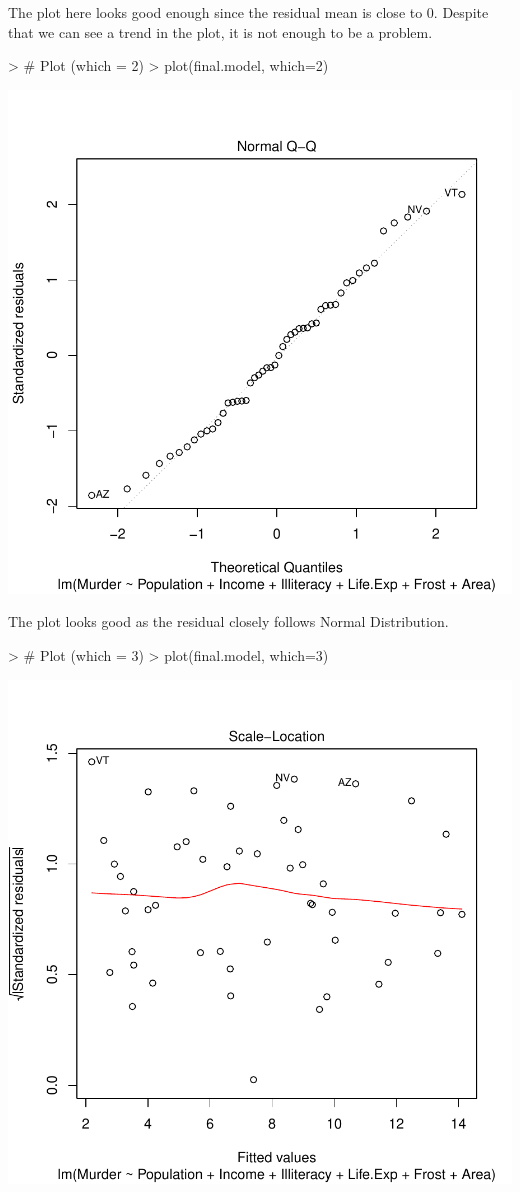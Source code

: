\documentclass{article}
\begin{document}
\noindent The plot here looks good enough since the residual mean is close to 0. Despite that we can see a trend in the plot, it is not enough to be a problem.
\begin{Schunk}
\begin{Sinput}
> # Plot (which = 2)
> plot(final.model, which=2)
\end{Sinput}
\end{Schunk}
\includegraphics{Assignment2-016}

\noindent The plot looks good as the residual closely follows Normal Distribution.

\begin{Schunk}
\begin{Sinput}
> # Plot (which = 3)
> plot(final.model, which=3)
\end{Sinput}
\end{Schunk}
\includegraphics{Assignment2-017}
\end{document}
